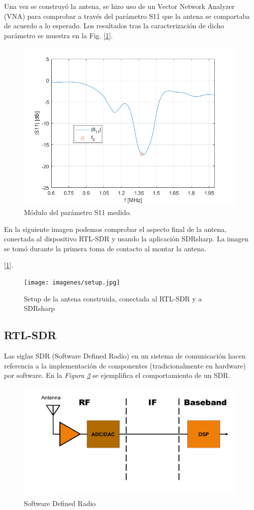 \documentclass[a4paper,openright,12pt]{article}
\begin{document}
Una vez se construyó la antena, se hizo uso de un Vector Network Analyzer (VNA) para comprobar a través del parámetro S11 que la antena se comportaba de acuerdo a lo esperado. Los resultados tras la caracterización de dicho parámetro se muestra en la Fig. [\ref{fig:S11}].
\begin{figure}[h!]
    \centering
    \includegraphics[width=0.55\linewidth]{imagenes/S11.png}
    \caption{Módulo del parámetro S11 medido.}
    \label{fig:S11}
\end{figure}

En la siguiente imagen podemos comprobar el aspecto final de la antena, conectada al dispositivo RTL-SDR y usando la aplicación SDRsharp. La imagen se tomó durante la primera toma de contacto al montar la antena.

[\ref{fig:S11}].
\begin{figure}[h!]
    \centering
    \texttt{[image: imagenes/setup.jpg]}
    \caption{Setup de la antena construida, conectada al RTL-SDR y a SDRsharp}
    \label{antena_real}
\end{figure}


	\subsection{RTL-SDR}
	Las siglas SDR (Software Defined Radio) en un sistema de comunicación hacen referencia a la implementación de componentes (tradicionalmente en hardware) por software. En la \textit{Figura \ref{SDR}} se ejemplifica el comportamiento de un SDR.
	
 \begin{figure}[hbtp]
 \centering
 \includegraphics[width = 12cm]{imagenes/sdr.jpg}
 \caption{Software Defined Radio}
 \label{SDR}
 \end{figure}
\end{document}
